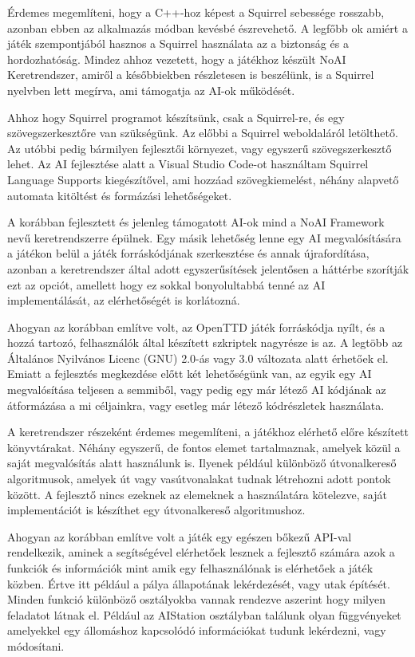 Érdemes megemlíteni, hogy a C++-hoz képest a Squirrel sebessége rosszabb, azonban ebben az alkalmazás módban kevésbé észrevehető. A legfőbb ok amiért a játék szempontjából hasznos a Squirrel használata az a biztonság és a hordozhatóság. Mindez ahhoz vezetett, hogy a játékhoz készült NoAI Keretrendszer, amiről a későbbiekben részletesen is beszélünk, is a Squirrel nyelvben lett megírva, ami támogatja az AI-ok működését.

Ahhoz hogy Squirrel programot készítsünk, csak a Squirrel-re, és egy szövegszerkesztőre van szükségünk. Az előbbi a Squirrel weboldaláról letölthető. Az utóbbi pedig bármilyen fejlesztői környezet, vagy egyszerű szövegszerkesztő lehet. Az AI fejlesztése alatt a Visual Studio Code-ot használtam Squirrel Language Supports kiegészítővel, ami hozzáad szövegkiemelést, néhány alapvető automata kitöltést és formázási lehetőségeket.



A korábban fejlesztett és jelenleg támogatott AI-ok mind a NoAI Framework nevű keretrendszerre épülnek. Egy másik lehetőség lenne egy AI megvalósítására a játékon belül a játék forráskódjának szerkesztése és annak újrafordítása, azonban a keretrendszer által adott egyszerűsítések jelentősen a háttérbe szorítják ezt az opciót, amellett hogy ez sokkal bonyolultabbá tenné az AI implementálását, az elérhetőségét is korlátozná.

Ahogyan az korábban említve volt, az OpenTTD játék forráskódja nyílt, és a hozzá tartozó, felhasználók által készített szkriptek nagyrésze is az. A legtöbb az Általános Nyilvános Licenc (GNU) 2.0-ás vagy 3.0 változata alatt érhetőek el. Emiatt a fejlesztés megkezdése előtt két lehetőségünk van, az egyik egy AI megvalósítása teljesen a semmiből, vagy pedig egy már létező AI kódjának az átformázása a mi céljainkra, vagy esetleg már létező kódrészletek használata.

A keretrendszer részeként érdemes megemlíteni, a játékhoz elérhető előre készített könyvtárakat. Néhány egyszerű, de fontos elemet tartalmaznak, amelyek közül a saját megvalósítás alatt használunk is. Ilyenek például különböző útvonalkereső algoritmusok, amelyek út vagy vasútvonalakat tudnak létrehozni adott pontok között. A fejlesztő nincs ezeknek az elemeknek a használatára kötelezve, saját implementációt is készíthet egy útvonalkereső algoritmushoz.



Ahogyan az korábban említve volt a játék egy egészen bőkezű API-val rendelkezik, aminek a segítségével elérhetőek lesznek a fejlesztő számára azok a funkciók és információk mint amik egy felhasználónak is elérhetőek a játék közben. Értve itt például a pálya állapotának lekérdezését, vagy utak építését. Minden funkció különböző osztályokba vannak rendezve aszerint hogy milyen feladatot látnak el. Például az AIStation osztályban találunk olyan függvényeket amelyekkel egy állomáshoz kapcsolódó információkat tudunk lekérdezni, vagy módosítani.

